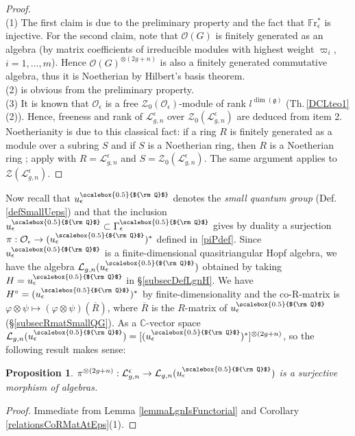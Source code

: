 \documentclass[11pt]{amsart}
\newtheorem{prop}[teo]{Proposition}
\newcommand{\e}{\epsilon}
\newcommand{\Ll}{\mathcal{L}}
\newcommand{\Oo}{\mathcal{O}}
\newcommand{\Q}{{\scalebox{0.5}{${\rm Q}$}}}
\begin{document}
\begin{proof}
\\(1) The first claim is due to the preliminary property and the fact that $\mathbb{F}\mathrm{r}_\e^*$ is injective. For the second claim,  note that $\mathcal{O}(G)$ is finitely generated as an algebra (by matrix coefficients of irreducible modules with highest weight $\varpi_i$, $i=1,\ldots,m$). Hence $\mathcal{O}(G)^{\otimes (2g+n)}$ is also a finitely generated commutative algebra, thus it is Noetherian by Hilbert's basis theorem.
\\(2) is obvious from the preliminary property.
\\(3) It is known that $\Oo_\e$ is a free $\mathcal{Z}_0(\Oo_\e)$-module of rank $l ^{\dim(\mathfrak{g})}$ (Th.\,\ref{DCLteo1} (2)). Hence, freeness and rank of $\mathcal{L}_{g,n}^\e$ over $\mathcal{Z}_0(\mathcal{L}_{g,n}^\e)$ are deduced from item 2. Noetherianity is due to this classical fact: if a ring $R$ is finitely generated as a module over a subring $S$ and if $S$ is a Noetherian ring, then $R$ is a Noetherian ring \cite[Prop.\,7.2]{AMacD}; apply with $R = \mathcal{L}_{g,n}^\e$ and $S = \mathcal{Z}_0(\mathcal{L}_{g,n}^\e)$. The same argument applies to  $\mathcal{Z}(\Ll_{g,n}^{\e})$.
\end{proof}

Now recall that $u_\e^\Q$ denotes the {\em small quantum group} (Def.\,\ref{defSmallUeps}) and that the inclusion $u_\e^\Q \subset \Gamma_\e^\Q$ gives by duality a surjection $\pi : \Oo_\e \to (u_\e^\Q)^*$ defined in \eqref{piPdef}. Since $u_\e^\Q$ is a finite-dimensional quasitriangular Hopf algebra, we have the algebra $\mathcal{L}_{g,n}(u_\e^\Q)$ obtained by taking $H = u_\e^\Q$ in \S\ref{subsecDefLgnH}. We have $H^\circ = (u_\e^\Q)^*$ by finite-dimensionality and the co-R-matrix is $\varphi \otimes \psi \mapsto (\varphi \otimes \psi)(\overline{R})$, where $\overline{R}$ is the $R$-matrix of $u_\e^\Q$ (\S\ref{subsecRmatSmallQG}). As a $\mathbb{C}$-vector space $\mathcal{L}_{g,n}(u_\e^\Q) = [(u_\e^\Q)^* ]^{\otimes (2g+n)}$, so the following result makes sense:

\begin{prop}\label{piMorphBetweenLgn}
$\pi^{\otimes (2g+n)} : \mathcal{L}_{g,n}^\e \to \mathcal{L}_{g,n}(u_\e^\Q)$ is a surjective morphism of algebras.
\end{prop}
\begin{proof}
Immediate from Lemma \ref{lemmaLgnIsFunctorial} and Corollary \ref{relationsCoRMatAtEps}(1).
\end{proof}
\end{document}
